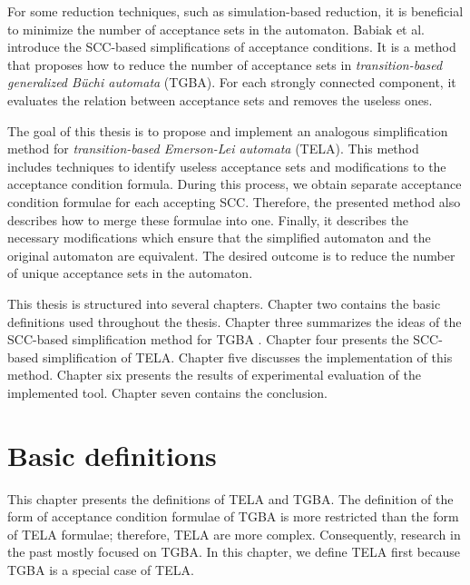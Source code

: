 \documentclass[
  digital, %
  twoside, %
  table,   %
  lof,     %
  lot,     %
]{fithesis3}
\begin{document}
For some reduction techniques, such as simulation-based reduction, it is beneficial to minimize the number of acceptance sets in the automaton. Babiak et al. \cite{spin2013} introduce the SCC-based simplifications of acceptance conditions. It is a method that proposes how to reduce the number of acceptance sets in \emph{transition-based generalized Büchi automata} (TGBA). For each strongly connected component, it evaluates the relation between acceptance sets and removes the useless ones. 

The goal of this thesis is to propose and implement an analogous simplification method for \emph{transition-based Emerson-Lei automata} (TELA). This method includes techniques to identify useless acceptance sets and modifications to the acceptance condition formula. During this process, we obtain separate acceptance condition formulae for each accepting SCC. Therefore, the presented method also describes how to merge these formulae into one. Finally, it describes the necessary modifications which ensure that the simplified automaton and the original automaton are equivalent. The desired outcome is to reduce the number of unique acceptance sets in the automaton. 

This thesis is structured into several chapters. Chapter two contains the basic definitions used throughout the thesis. Chapter three summarizes the ideas of the SCC-based simplification method for TGBA \cite{spin2013}. Chapter four presents the SCC-based simplification of TELA. Chapter five discusses the implementation of this method. Chapter six presents the results of experimental evaluation of the implemented tool. Chapter seven contains the conclusion. 

\chapter{Basic definitions}
\label{chap:basic_definitions}
This chapter presents the definitions of TELA and TGBA. The definition of the form of acceptance condition formulae of TGBA is more restricted than the form of TELA formulae; therefore, TELA are more complex. Consequently, research in the past mostly focused on TGBA.  In this chapter, we define TELA first because TGBA is a special case of TELA.
\end{document}
